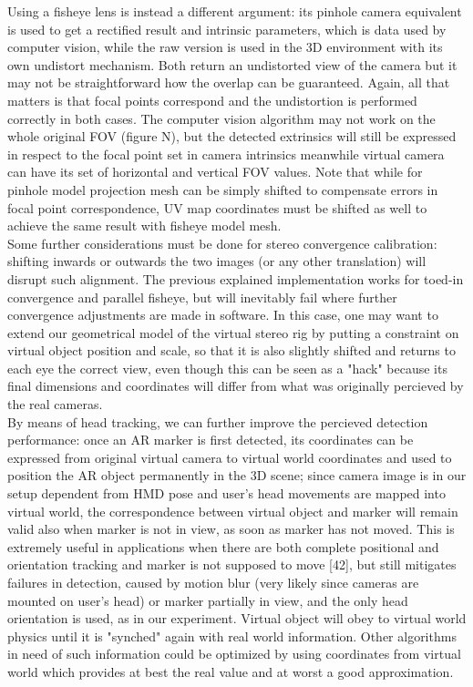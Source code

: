 Using a fisheye lens is instead a different argument: its pinhole camera equivalent is used to get a rectified result and intrinsic parameters, which is data used by computer vision, while the raw version is used in the 3D environment with its own undistort mechanism. Both return an undistorted view of the camera but it may not be straightforward how the overlap can be guaranteed. Again, all that matters is that focal points correspond and the undistortion is performed correctly in both cases. The computer vision algorithm may not work on the whole original FOV (figure N), but the detected extrinsics will still be expressed in respect to the focal point set in camera intrinsics meanwhile virtual camera can have its set of horizontal and vertical FOV values. Note that while for pinhole model projection mesh can be simply shifted to compensate errors in focal point correspondence, UV map coordinates must be shifted as well to achieve the same result with fisheye model mesh.\\
Some further considerations must be done for stereo convergence calibration: shifting inwards or outwards the two images (or any other translation) will disrupt such alignment. The previous explained implementation works for toed-in convergence and parallel fisheye, but will inevitably fail where further convergence adjustments are made in software. In this case, one may want to extend our geometrical model of the virtual stereo rig by putting a constraint on virtual object position and scale, so that it is also slightly shifted and returns to each eye the correct view, even though this can be seen as a "hack" because its final dimensions and coordinates will differ from what was originally percieved by the real cameras.\\
By means of head tracking, we can further improve the percieved detection performance: once an AR marker is first detected, its coordinates can be expressed from original virtual camera to virtual world coordinates and used to position the AR object permanently in the 3D scene; since camera image is in our setup dependent from HMD pose and user's head movements are mapped into virtual world, the correspondence between virtual object and marker will remain valid also when marker is not in view, as soon as marker has not moved. This is extremely useful in applications when there are both complete positional and orientation tracking and marker is not supposed to move [42], but still mitigates failures in detection, caused by motion blur (very likely since cameras are mounted on user's head)  or marker partially in view, and the only head orientation is used, as in our experiment. Virtual object will obey to virtual world physics until it is "synched" again with real world information. Other algorithms in need of such information could be optimized by using coordinates from virtual world which provides at best the real value and at worst a good approximation.

